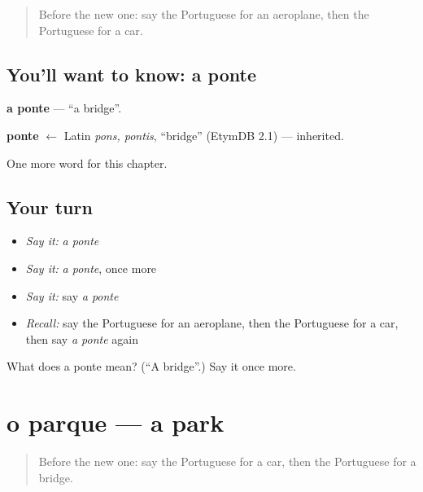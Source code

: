 \label{lesson:PT-C74-ponte}



\begin{quote}
Before the new one: say the Portuguese for an aeroplane, then the Portuguese for a car.
\end{quote}

\subsection*{You'll want to know: a ponte}
\textbf{a ponte} — \textquotedblleft{}a bridge\textquotedblright{}.

\begin{cousinweb}
\textbf{ponte} $\leftarrow$ Latin \emph{pons, pontis}, \textquotedblleft{}bridge\textquotedblright{} (EtymDB 2.1) — inherited.
\end{cousinweb}

\begin{grammarlens}[title={What you've built}]
One more word for this chapter.
\end{grammarlens}

\subsection*{Your turn}
\begin{itemize}
\raggedright
  \item \emph{Say it:} \emph{a ponte}
  \item \emph{Say it:} \emph{a ponte}, once more
  \item \emph{Say it:} say \emph{a ponte}
  \item \emph{Recall:} say the Portuguese for an aeroplane, then the Portuguese for a car, then say \emph{a ponte} again
\end{itemize}

\begin{tcolorbox}[breakable,colback=teal!4,colframe=teal!35!black,title={Before you move on}]
What does a ponte mean? (\textquotedblleft{}A bridge\textquotedblright{}.) Say it once more.
\end{tcolorbox}
\section[o parque]{o parque — a park}

\label{lesson:PT-C74-parque}



\begin{quote}
Before the new one: say the Portuguese for a car, then the Portuguese for a bridge.
\end{quote}

